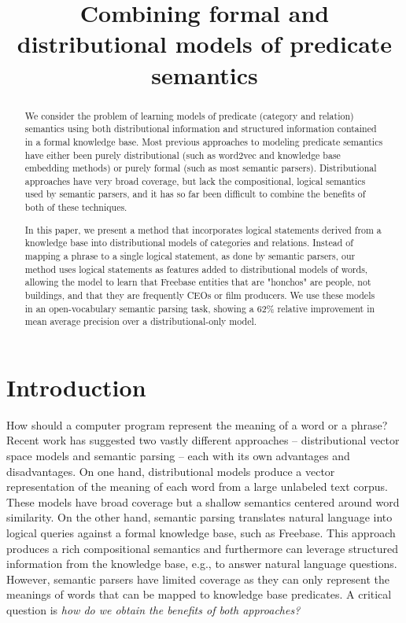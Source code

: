 \documentclass[11pt]{article}
\title{Combining formal and distributional models of predicate semantics}
\author{}%
\date{}
\begin{document}
\maketitle

\begin{abstract}

  We consider the problem of learning models of predicate (category and
  relation) semantics using both distributional information and structured
  information contained in a formal knowledge base.  Most previous approaches
  to modeling predicate semantics have either been purely distributional (such
  as word2vec and knowledge base embedding methods) or purely formal (such as
  most semantic parsers).  Distributional approaches have very broad coverage,
  but lack the compositional, logical semantics used by semantic parsers, and
  it has so far been difficult to combine the benefits of both of these
  techniques.

  In this paper, we present a method that incorporates logical statements
  derived from a knowledge base into distributional models of categories and
  relations.  Instead of mapping a phrase to a single logical statement, as
  done by semantic parsers, our method uses logical statements as features
  added to distributional models of words, allowing the model to learn that
  Freebase entities that are "honchos" are people, not buildings, and that they
  are frequently CEOs or film producers.  We use these models in an
  open-vocabulary semantic parsing task, showing a 62\% relative improvement in
  mean average precision over a distributional-only model.

\end{abstract}

\section{Introduction}

How should a computer program represent the meaning of a word or a
phrase? Recent work has suggested two vastly different approaches --
distributional vector space models and semantic parsing -- each with
its own advantages and disadvantages. On one hand, distributional
models produce a vector representation of the meaning of each word
from a large unlabeled text corpus. These models have broad coverage
but a shallow semantics centered around word similarity. On the other
hand, semantic parsing translates natural language into logical
queries against a formal knowledge base, such as Freebase. This
approach produces a rich compositional semantics and furthermore can
leverage structured information from the knowledge base, e.g., to
answer natural language questions. However, semantic parsers have
limited coverage as they can only represent the meanings of words that
can be mapped to knowledge base predicates. A critical question is
\emph{how do we obtain the benefits of both approaches?}
\end{document}
